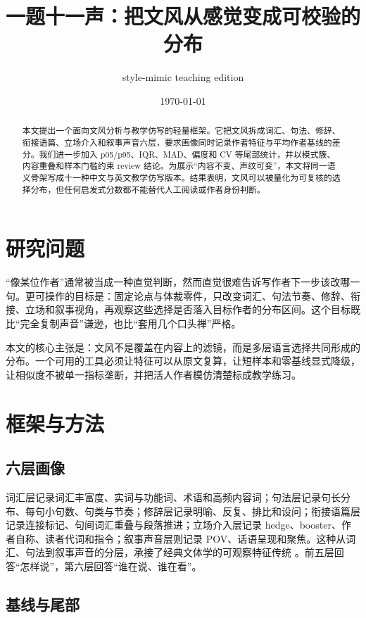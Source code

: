 \documentclass[UTF8,a4paper,11pt]{ctexart}
\title{一题十一声：把文风从感觉变成可校验的分布}
\author{style-mimic teaching edition}
\date{\today}
\begin{document}
\maketitle
\begin{abstract}
本文提出一个面向文风分析与教学仿写的轻量框架。它把文风拆成词汇、句法、修辞、衔接语篇、立场介入和叙事声音六层，要求画像同时记录作者特征与平均作者基线的差分。我们进一步加入 p05/p95、IQR、MAD、偏度和 CV 等尾部统计，并以模式簇、内容重叠和样本门槛约束 review 结论。为展示“内容不变、声纹可变”，本文将同一语义骨架写成十一种中文与英文教学仿写版本。结果表明，文风可以被量化为可复核的选择分布，但任何启发式分数都不能替代人工阅读或作者身份判断。
\end{abstract}

\section{研究问题}

“像某位作者”通常被当成一种直觉判断，然而直觉很难告诉写作者下一步该改哪一句。更可操作的目标是：固定论点与体裁零件，只改变词汇、句法节奏、修辞、衔接、立场和叙事视角，再观察这些选择是否落入目标作者的分布区间。这个目标既比“完全复制声音”谦逊，也比“套用几个口头禅”严格。

本文的核心主张是：文风不是覆盖在内容上的滤镜，而是多层语言选择共同形成的分布。一个可用的工具必须让特征可以从原文复算，让短样本和零基线显式降级，让相似度不被单一指标垄断，并把活人作者模仿清楚标成教学练习。

\section{框架与方法}

\subsection{六层画像}

词汇层记录词汇丰富度、实词与功能词、术语和高频内容词；句法层记录句长分布、每句小句数、句类与节奏；修辞层记录明喻、反复、排比和设问；衔接语篇层记录连接标记、句间词汇重叠与段落推进；立场介入层记录 hedge、booster、作者自称、读者代词和指令；叙事声音层则记录 POV、话语呈现和聚焦。这种从词汇、句法到叙事声音的分层，承接了经典文体学的可观察特征传统 \citep{leech1981style,biber1988variation,hyland2005stance}。前五层回答“怎样说”，第六层回答“谁在说、谁在看”。

\subsection{基线与尾部}
\end{document}
